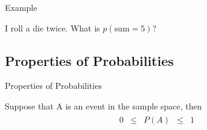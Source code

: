 \begin{frame}{Example}

  I roll a die twice. What is $p(\mathrm{sum}=5)$?
  
\end{frame}


\subsection{Properties of Probabilities}

\begin{frame}{Properties of Probabilities}

  Suppose that A is an event in the sample space, then
  \begin{eqnarray*}
    \begin{array}{rcccl}
      0 & \leq & P(A) & \leq & 1
    \end{array}
  \end{eqnarray*}
  
\end{frame}


